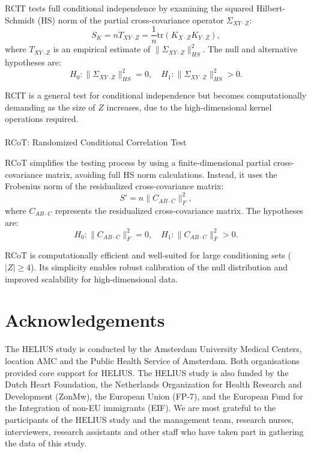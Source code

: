 \documentclass[
]{article}
\makeatletter
\let\oldparagraph\paragraph
\renewcommand{\paragraph}{
    \@ifstar
      \xxxParagraphStar
      \xxxParagraphNoStar
  }
\newcommand{\xxxParagraphStar}[1]{\oldparagraph*{#1}\mbox{}}
\newcommand{\xxxParagraphNoStar}[1]{\oldparagraph{#1}\mbox{}}
\makeatother
\begin{document}
RCIT tests full conditional independence by examining the squared
Hilbert-Schmidt (HS) norm of the partial cross-covariance operator
\(\Sigma_{XY \cdot Z}\): \[
S_K = n T_{XY \cdot Z} = \frac{1}{n} \text{tr}(K_{X \cdot Z} K_{Y \cdot Z}),
\] where \(T_{XY \cdot Z}\) is an empirical estimate of
\(\|\Sigma_{XY \cdot Z}\|^2_{HS}\). The null and alternative hypotheses
are: \[
H_0: \|\Sigma_{XY \cdot Z}\|^2_{HS} = 0, \quad H_1: \|\Sigma_{XY \cdot Z}\|^2_{HS} > 0.
\]

RCIT is a general test for conditional independence but becomes
computationally demanding as the size of \(Z\) increases, due to the
high-dimensional kernel operations required.

\paragraph{RCoT: Randomized Conditional Correlation
Test}\label{rcot-randomized-conditional-correlation-test}

RCoT simplifies the testing process by using a finite-dimensional
partial cross-covariance matrix, avoiding full HS norm calculations.
Instead, it uses the Frobenius norm of the residualized cross-covariance
matrix: \[
S' = n \|C_{AB \cdot C}\|_F^2,
\] where \(C_{AB \cdot C}\) represents the residualized cross-covariance
matrix. The hypotheses are: \[
H_0: \|C_{AB \cdot C}\|_F^2 = 0, \quad H_1: \|C_{AB \cdot C}\|_F^2 > 0.
\]

RCoT is computationally efficient and well-suited for large conditioning
sets (\(|Z| \geq 4\)). Its simplicity enables robust calibration of the
null distribution and improved scalability for high-dimensional data.

\section*{Acknowledgements}\label{acknowledgements}

The HELIUS study is conducted by the Amsterdam University Medical
Centers, location AMC and the Public Health Service of Amsterdam. Both
organisations provided core support for HELIUS. The HELIUS study is also
funded by the Dutch Heart Foundation, the Netherlands Organization for
Health Research and Development (ZonMw), the European Union (FP-7), and
the European Fund for the Integration of non-EU immigrants (EIF). We are
most grateful to the participants of the HELIUS study and the management
team, research nurses, interviewers, research assistants and other staff
who have taken part in gathering the data of this study.
\end{document}
